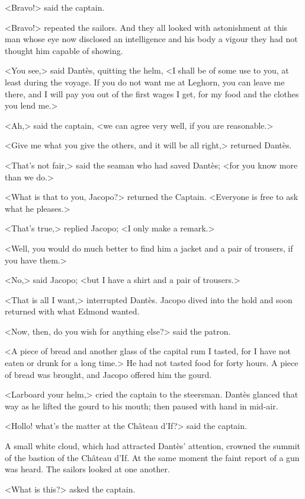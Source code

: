  <Bravo!> said the captain. 

 <Bravo!> repeated the sailors. And they all looked with astonishment at this man whose eye now disclosed an intelligence and his body a vigour they had not thought him capable of showing. 

 <You see,> said Dantès, quitting the helm, <I shall be of some use to you, at least during the voyage. If you do not want me at Leghorn, you can leave me there, and I will pay you out of the first wages I get, for my food and the clothes you lend me.> 

 <Ah,> said the captain, <we can agree very well, if you are reasonable.> 

 <Give me what you give the others, and it will be all right,> returned Dantès. 

 <That's not fair,> said the seaman who had saved Dantès; <for you know more than we do.> 

 <What is that to you, Jacopo?> returned the Captain. <Everyone is free to ask what he pleases.> 

 <That's true,> replied Jacopo; <I only make a remark.> 

 <Well, you would do much better to find him a jacket and a pair of trousers, if you have them.> 

 <No,> said Jacopo; <but I have a shirt and a pair of trousers.> 

 <That is all I want,> interrupted Dantès. Jacopo dived into the hold and soon returned with what Edmond wanted. 

 <Now, then, do you wish for anything else?> said the patron. 

 <A piece of bread and another glass of the capital rum I tasted, for I have not eaten or drunk for a long time.> He had not tasted food for forty hours. A piece of bread was brought, and Jacopo offered him the gourd. 

 <Larboard your helm,> cried the captain to the steersman. Dantès glanced that way as he lifted the gourd to his mouth; then paused with hand in mid-air. 

 <Hollo! what's the matter at the Château d'If?> said the captain. 

 A small white cloud, which had attracted Dantès' attention, crowned the summit of the bastion of the Château d'If. At the same moment the faint report of a gun was heard. The sailors looked at one another. 

 <What is this?> asked the captain. 

